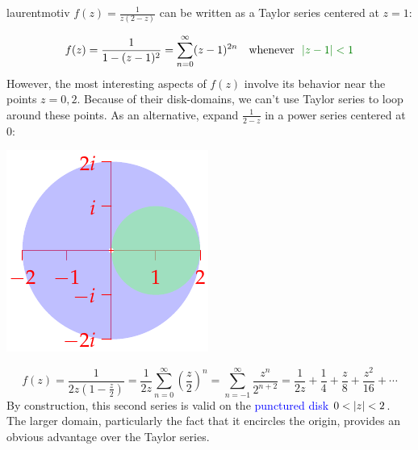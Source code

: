 \begin{example}{}{laurentmotiv}
$f(z)=\frac 1{z(2-z)}$ can be written as a Taylor series centered at $z=1$:\par
\begin{minipage}[t]{0.7\linewidth}\vspace{-10pt}
\[f(z)=\frac 1{1-(z-1)^2} =\sum_{n=0}^\infty (z-1)^{2n}\quad\text{whenever \ \textcolor{Green}{$\nm{z-1}<1$}}\]
However, the most interesting aspects of $f(z)$ involve its behavior near the points $z=0,2$. Because of their disk-domains, we can't use Taylor series to loop around these points.\smallbreak
As an alternative, expand $\frac 1{2-z}$ in a power series centered at 0:
\end{minipage}\begin{minipage}[t]{0.3\linewidth}\vspace{-10pt}
\flushright\includegraphics{laurent}
\end{minipage}\par\vspace{-10pt}
\[f(z)=\frac 1{2z(1-\frac{z}{2})}=\frac 1{2z}\sum_{n=0}^\infty\left(\frac z2\right)^n =\sum_{n=-1}^\infty\frac{z^n}{2^{n+2}} =\frac 1{2z}+\frac 14+\frac z8+\frac{z^2}{16}+\cdots\]
By construction, this second series is valid on the \textcolor{blue}{punctured disk $0<\left| z\right|<2$}. The larger domain, particularly the fact that it encircles the origin, provides an obvious advantage over the Taylor series. 
\end{example}

